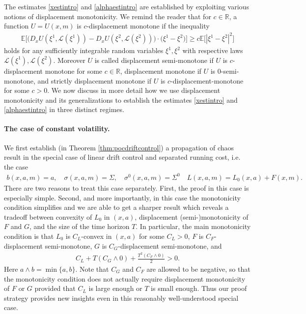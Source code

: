 \documentclass[11pt,reqno]{amsart}
\numberwithin{equation}{section}
\theoremstyle{definition}
\def\E{{\mathbb E}}
\def\R{{\mathbb R}}
\newcommand{\sL}{\mathcal{L}}
\def \E{\mathbb{E}}
\def \R{\mathbb{R}}
\begin{document}
The estimates \eqref{xestintro} and \eqref{alphaestintro} are established by exploiting various notions of displacement monotonicity. We remind the reader that for $c \in \R$, a function $U = U(x,m)$ is $c$-displacement monotone
if the inequality 
\begin{align} \label{def:dispsemimonotone}
\E\bigg[ \Big(D_x U(\xi^1,\sL(\xi^1)) - D_x U(\xi^2, \sL(\xi^2)) \Big) \cdot \big(\xi^1 - \xi^2 \big) \bigg] \geq c \E\big[|\xi^1 - \xi^2|^2\big] 
\end{align}
holds for any sufficiently integrable random variables $\xi^1,\xi^2$ with respective laws $\sL(\xi^1), \sL(\xi^2)$.
Moreover $U$ is called displacement semi-monotone if $U$ is $c$-displacement monotone for some $c \in \R$, displacement monotone if $U$ is $0$-semi-monotone, and strictly displacement monotone if $U$ is $c$-displacement-monotone for some $c > 0$. We now discuss in more detail how we use displacement monotonicity and its generalizations to establish the estimates \eqref{xestintro} and \eqref{alphaestintro} in three distinct regimes.
\newline
\paragraph{\textbf{The case of constant volatility}.} We first establish (in Theorem \ref{thm:pocdriftcontrol}) a propagation of chaos result in the special case of linear drift control and separated running cost, i.e. the case 
\begin{align*}
b(x,a,m) = a, \quad \sigma(x,a,m) = \Sigma, \quad  \sigma^0(x,a,m) = \Sigma^0 \quad L(x,a,m) = L_0(x,a) + F(x,m). 
\end{align*}
There are two reasons to treat this case separately. First, the proof in this case is especially simple. Second, and more importantly, in this case the monotonicity condition simplifies and we are able to get a sharper result which reveals a tradeoff between convexity of $L_0$ in $(x,a)$, displacement (semi-)monotonicity of $F$ and $G$, and the size of the time horizon $T$. In particular, the main monotonicity condition is that $L_0$ is $C_L$-convex in $(x,a)$ for some $C_L > 0$, $F$ is $C_F$-displacement semi-monotone, $G$ is $C_G$-displacement semi-monotone, and 
\begin{align} \label{constantvolstruct}
C_L + T (C_G \wedge 0) + \frac{T^2 (C_F \wedge 0)}{2} > 0. 
\end{align}
Here $a \wedge b = \min \{a,b\}$. Note that $C_G$ and $C_F$ are allowed to be negative, so that the monotonicity condition does not actually require displacement monotonicity of $F$ or $G$ provided that $C_L$ is large enough or $T$ is small enough. Thus our proof strategy provides new insights even in this reasonably well-understood special case.
\newline
\end{document}

